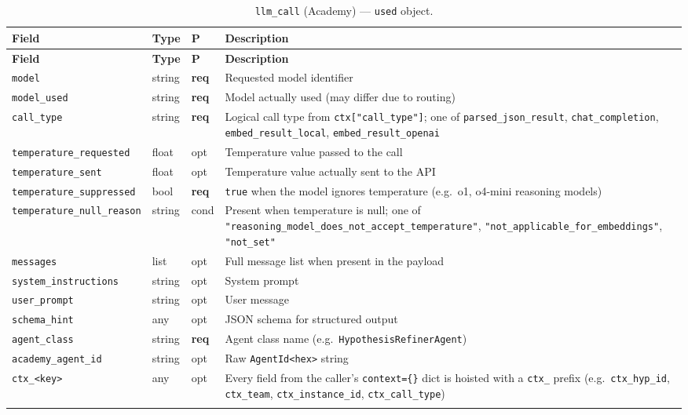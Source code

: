 \documentclass[11pt,a4paper]{article}
\newcommand{\opt}{\textcolor{optred}{opt}}
\newcommand{\cond}{\textcolor{condorange}{cond}}
\newcommand{\req}{\textbf{req}}
\newcommand{\subtype}[1]{\texttt{\textcolor{subtypeblue}{#1}}}
\begin{document}
\begin{longtable}{L{4cm} L{2.5cm} C{1.2cm} L{6.5cm}}
\toprule
\textbf{Field} & \textbf{Type} & \textbf{P} & \textbf{Description} \\
\midrule
\endfirsthead
\toprule \textbf{Field} & \textbf{Type} & \textbf{P} & \textbf{Description} \\
\midrule
\endhead
\bottomrule
\endlastfoot

\texttt{model}
  & string & \req & Requested model identifier \\
\texttt{model\_used}
  & string & \req & Model actually used (may differ due to routing) \\
\texttt{call\_type}
  & string & \req
  & Logical call type from \texttt{ctx["call\_type"]}; one of
    \texttt{parsed\_json\_result}, \texttt{chat\_completion},
    \texttt{embed\_result\_local}, \texttt{embed\_result\_openai} \\
\texttt{temperature\_requested}
  & float & \opt & Temperature value passed to the call \\
\texttt{temperature\_sent}
  & float & \opt & Temperature value actually sent to the API \\
\texttt{temperature\_suppressed}
  & bool & \req
  & \texttt{true} when the model ignores temperature
    (e.g.\ o1, o4-mini reasoning models) \\
\texttt{temperature\_null\_reason}
  & string & \cond
  & Present when temperature is null; one of
    \texttt{"reasoning\_model\_does\_not\_accept\_temperature"},
    \texttt{"not\_applicable\_for\_embeddings"},
    \texttt{"not\_set"} \\
\texttt{messages}
  & list & \opt & Full message list when present in the payload \\
\texttt{system\_instructions}
  & string & \opt & System prompt \\
\texttt{user\_prompt}
  & string & \opt & User message \\
\texttt{schema\_hint}
  & any & \opt & JSON schema for structured output \\
\texttt{agent\_class}
  & string & \req & Agent class name (e.g.\ \texttt{HypothesisRefinerAgent}) \\
\texttt{academy\_agent\_id}
  & string & \opt & Raw \texttt{AgentId<hex>} string \\
\texttt{ctx\_<key>}
  & any & \opt
  & Every field from the caller's \texttt{context=\{\}} dict is hoisted
    with a \texttt{ctx\_} prefix
    (e.g.\ \texttt{ctx\_hyp\_id}, \texttt{ctx\_team},
    \texttt{ctx\_instance\_id}, \texttt{ctx\_call\_type}) \\

\caption{\subtype{llm\_call} (Academy) — \texttt{used} object.}
\end{longtable}
\end{document}
